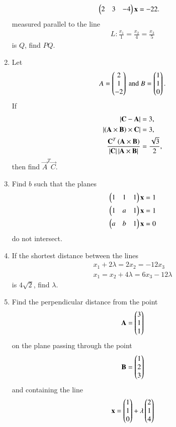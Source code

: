 \documentclass[journal,12pt,twocolumn]{IEEEtran}
\begin{document}
\begin{enumerate}[label=\arabic*.]
\begin{align}
\begin{pmatrix}2 & 3 & -4\end{pmatrix}\mathbf{x} &= -22.
\end{align}
%
measured parallel to the line
\begin{align}
L:\frac{x_1}{1}=
\frac{x_2}{4} = 
\frac{x_3}{5}
\end{align}
%
is $Q$, find $PQ$.
\item Let
\begin{equation}
A=\begin{pmatrix}2 \\ 1 \\ -2\end{pmatrix} \text{ and }
B=\begin{pmatrix}1 \\ 1 \\ 0\end{pmatrix}.
\end{equation}
%
If
\begin{align}
\left\vert\mathbf{C}-\mathbf{A}\right\vert &= 3,
\\
\left\vert\left(\mathbf{A}\times\mathbf{B}\right)\times\mathbf{C}\right\vert &= 3,
\\
\frac{\mathbf{C}^{T}\left(\mathbf{A}\times\mathbf{B}\right)}{\left\vert\mathbf{C}\right\vert\left\vert\mathbf{A}\times\mathbf{B}\right\vert} &= 
\frac{\sqrt{3}}{2},
\end{align}
then find $\vec{A}^{T}\vec{C}$.
\item Find $b$ such that the planes
\begin{align}
\begin{pmatrix}1 & 1 & 1\end{pmatrix}\mathbf{x} &= 1
\\
\begin{pmatrix}1 & a & 1\end{pmatrix}\mathbf{x} &= 1
\\
\begin{pmatrix}a & b & 1\end{pmatrix}\mathbf{x} &= 0
\end{align}
%
do not intersect.
\item If the shortest distance between the lines
\begin{align}
x_1 + 2\lambda = 2x_2=-12x_3
\\
x_1=x_2+4\lambda=6x_3-12\lambda
\end{align}
is $4\sqrt{2}$, find $\lambda$.
\item Find the perpendicular distance from the point 
\begin{equation}
\mathbf{A}=\begin{pmatrix}3 \\ 1 \\ 1\end{pmatrix}
\end{equation}
%
on the plane passing through the point
\begin{equation}
\mathbf{B}=\begin{pmatrix}1 \\ 2 \\ 3\end{pmatrix}
\end{equation}
%
and containing the line
\begin{equation}
\vec{x}=\myvec{1 \\ 1 \\ 0}+\lambda\myvec{2 \\ 1 \\ 4}

\end{equation}
\end{enumerate}
\end{document}
